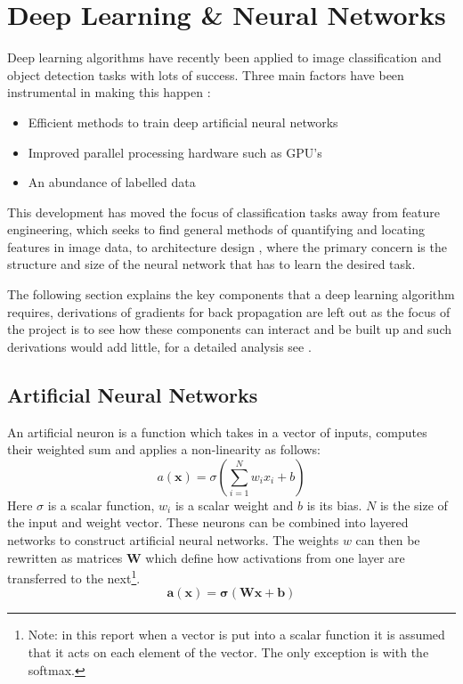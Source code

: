 \section{Deep Learning \& Neural Networks}
  Deep learning algorithms have recently been applied to image classification
  and object detection tasks with lots of success. \cite{Girshick2014,Krizhevsky2012}
  Three main factors have been instrumental in making this happen \cite{Jaiswal2016}:
  \begin{itemize}
    \item Efficient methods to train deep artificial neural networks
    \item Improved parallel processing hardware such as GPU's
    \item An abundance of labelled data
  \end{itemize}
  This development has moved the focus of classification tasks away from feature engineering,
  which seeks to find general methods of quantifying and locating features in image data, to
  architecture design \cite{StephenMerity2016}, where the primary concern is the structure and size of the neural network that has to
  learn the desired task.

  The following section explains the key components that a deep learning algorithm requires,
  derivations of gradients for back propagation are left out as the focus of the project is to
  see how these components can interact and be built up and such derivations would add little,
  for a detailed analysis see \cite{Bishop1995}.

  \subsection{Artificial Neural Networks} \label{sec:anns}
    An artificial neuron is a function which takes in a vector of inputs, computes their
    weighted sum and applies a non-linearity as follows:
    \begin{equation}
      a(\mathbf{x}) = \sigma \left ( \sum_{i=1}^N w_ix_i + b \right )
    \end{equation}
    Here $\sigma$ is a scalar function, $w_i$ is a scalar weight and $b$ is its bias. $N$ is the size of the input and weight vector.
    These neurons can be combined into layered networks to construct artificial neural networks.
    The weights $w$ can then be rewritten as matrices $\mathbf{W}$ which define how
    activations from one layer are transferred to the next\footnote{Note: in this report when a vector
    is put into a scalar function it is assumed that it acts on each element of
    the vector. The only exception is with the softmax.}.
    \begin{equation}
      \mathbf{a}(\mathbf{x}) = \mathbf{\sigma} \left ( \mathbf{W}\mathbf{x} + \mathbf{b} \right ) \label{eq:softmax}
    \end{equation}

